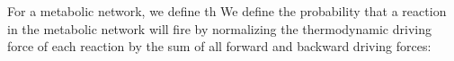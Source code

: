 For a metabolic network, we define th
We define the probability that a reaction in the metabolic network will fire by normalizing the thermodynamic driving force of each reaction by the sum of all forward and backward driving forces: